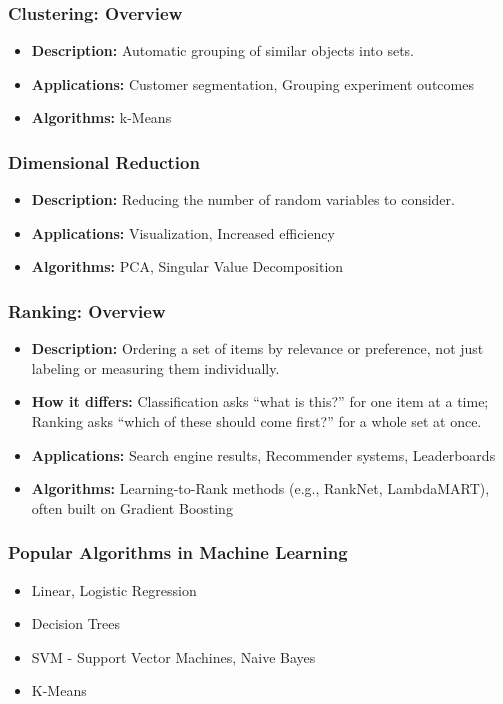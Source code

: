 \begin{frame}[fragile]\frametitle{Clustering: Overview}
\begin{itemize}
\item \textbf{Description:} Automatic grouping of similar objects into sets.
\item \textbf{Applications:} Customer segmentation, Grouping experiment outcomes
\item \textbf{Algorithms:} k-Means
\end{itemize}
\end{frame}

\begin{frame}[fragile]\frametitle{Dimensional Reduction}
\begin{itemize}
\item \textbf{Description:} Reducing the number of random variables to consider.
\item \textbf{Applications:} Visualization, Increased efficiency
\item \textbf{Algorithms:} PCA, Singular Value Decomposition
\end{itemize}
\end{frame}

\begin{frame}[fragile]\frametitle{Ranking: Overview}
\begin{itemize}
\item \textbf{Description:} Ordering a set of items by relevance or preference, not just labeling or measuring them individually.
\item \textbf{How it differs:} Classification asks ``what is this?'' for one item at a time; Ranking asks ``which of these should come first?'' for a whole set at once.
\item \textbf{Applications:} Search engine results, Recommender systems, Leaderboards
\item \textbf{Algorithms:} Learning-to-Rank methods (e.g., RankNet, LambdaMART), often built on Gradient Boosting
\end{itemize}
\end{frame}

\begin{frame}[fragile]\frametitle{Popular Algorithms in Machine Learning}
	\begin{itemize}
	\item  Linear, Logistic Regression
	\item  Decision Trees
	\item  SVM - Support Vector Machines, Naive Bayes
	\item K-Means
	\end{itemize}
\end{frame}

